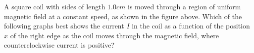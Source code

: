 \begin{questions}
\setcounter{question}{4}

\question
A square coil with sides of length $1.0\unit{cm}$ is moved through a region of uniform magnetic field at a constant speed, as shown in the figure above. Which of the following graphs best shows the current $I$ in the coil as a function of the position $x$ of the right edge as the coil moves through the magnetic field, where counterclockwise current is positive?

\begin{oneparchoices}
    \choice {}
    \choice {}

\end{oneparchoices}
\end{questions}
